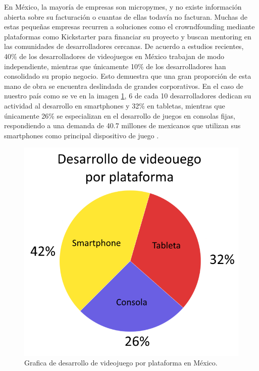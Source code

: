 En México, la mayoría de empresas son micropymes, y no existe información abierta sobre su facturación o cuantas de ellas todavía no facturan. Muchas de estas pequeñas empresas recurren a soluciones como el crowndfounding mediante plataformas como Kickstarter para financiar su proyecto y buscan mentoring en las comunidades de desarrolladores cercanas\cite{vid05}. De acuerdo a estudios recientes, 40\% de los desarrolladores de videojuegos en México trabajan de modo independiente, mientras que únicamente 10\% de los desarrolladores han consolidado su propio negocio. Esto demuestra que una gran proporción de esta mano de obra se encuentra deslindada de grandes corporativos. En el caso de nuestro país como se ve en la imagen \ref{fig:desVj}, 6 de cada 10 desarrolladores dedican su actividad al desarrollo en smartphones y 32\% en tabletas, mientras que únicamente 26\% se especializan en el desarrollo de juegos en consolas fijas, respondiendo a una demanda de 40.7 millones de mexicanos que utilizan sus smartphones como principal dispositivo de juego \cite{vid04}.
\\[1pt]
\begin{figure}
	\centering
	\includegraphics[width=\textwidth]{03MarcoTeorico/imageR/desVj.png}
	\caption{Grafica de desarrollo de videojuego por plataforma en México.}
	\label{fig:desVj}
\end{figure}

